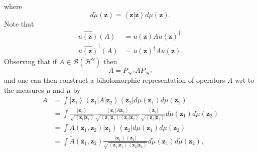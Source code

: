 \documentclass[aps,preprint]{revtex4}%
\begin{document}
where
\begin{equation}
d\tilde{\mu}\left(  \mathbf{z}\right)  =\left\langle \mathbf{z}\left\vert
\mathbf{z}\right.  \right\rangle d\mu\left(  \mathbf{z}\right)  .
\end{equation}
Note that
\begin{align}
\widehat{u\left(  \mathbf{z}\right)  }\left(  A\right)   &  =u\left(
\mathbf{z}\right)  Au\left(  \mathbf{z}\right)  ^{\dagger}\nonumber\\
\widehat{u\left(  \mathbf{z}\right)  }^{\dagger}\left(  A\right)   &
=u\left(  \mathbf{z}\right)  ^{\dagger}Au\left(  \mathbf{z}\right)  .
\end{align}
Observing that if $A\in\mathcal{B}\left(  \mathcal{H}^{2}\right)  $ then
\begin{equation}
A=P_{\mathcal{H}^{2}}AP_{\mathcal{H}^{2}}%
\end{equation}
and one can then construct a biholomorphic representation of operators $A$ wrt
to the measures $\mu$ and $\tilde{\mu}$ by
\begin{align}
A &  =\int\left\vert \mathbf{z}_{1}\right\rangle \left\langle \mathbf{z}%
_{1}\right\vert A\left\vert \mathbf{z}_{2}\right\rangle \left\langle
\mathbf{z}_{2}\right\vert d\mu\left(  \mathbf{z}_{1}\right)  d\mu\left(
\mathbf{z}_{2}\right)  \nonumber\\
&  =\int\frac{\left\vert \mathbf{z}_{1}\right\rangle }{\sqrt{\left\langle
\mathbf{z}_{1}\left\vert \mathbf{z}_{1}\right.  \right\rangle }}%
\frac{\left\langle \mathbf{z}_{1}\left\vert A\mathbf{z}_{2}\right.
\right\rangle }{\sqrt{\left\langle \mathbf{z}_{1}\left\vert \mathbf{z}%
_{1}\right.  \right\rangle \left\langle \mathbf{z}_{2}\left\vert
\mathbf{z}_{2}\right.  \right\rangle }}\frac{\left\langle \mathbf{z}%
_{2}\right\vert }{\sqrt{\left\langle \mathbf{z}_{2}\left\vert \mathbf{z}%
_{2}\right.  \right\rangle }}d\tilde{\mu}\left(  \mathbf{z}_{1}\right)
d\tilde{\mu}\left(  \mathbf{z}_{2}\right)  \nonumber\\
&  =\int A\left(  \mathbf{\bar{z}}_{1},\mathbf{z}_{2}\right)  \left\vert
\mathbf{z}_{1}\right\rangle \left\langle \mathbf{z}_{2}\right\vert d\mu\left(
\mathbf{z}_{1}\right)  d\mu\left(  \mathbf{z}_{2}\right)  \nonumber\\
&  =\int\tilde{A}\left(  \mathbf{\bar{z}}_{1},\mathbf{z}_{2}\right)
\frac{\left\vert \mathbf{z}_{1}\right\rangle \left\langle \mathbf{z}%
_{2}\right\vert }{\sqrt{\left\langle \mathbf{z}_{1}\left\vert \mathbf{z}%
_{1}\right.  \right\rangle \left\langle \mathbf{z}_{2}\left\vert
\mathbf{z}_{2}\right.  \right\rangle }}d\tilde{\mu}\left(  \mathbf{z}%
_{1}\right)  d\tilde{\mu}\left(  \mathbf{z}_{2}\right)  ,
\end{align}
\end{document}
